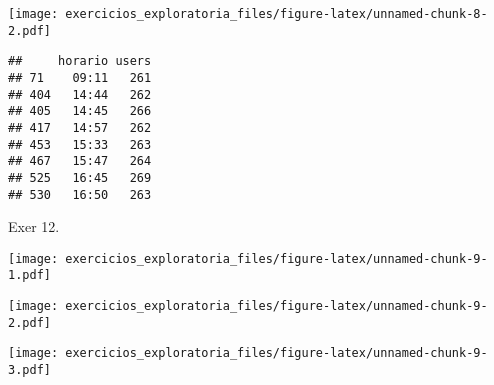 \documentclass[
]{article}
\newenvironment{Shaded}{\begin{snugshade}}{\end{snugshade}}
\newcommand{\AttributeTok}[1]{\textcolor[rgb]{0.13,0.29,0.53}{#1}}
\newcommand{\CommentTok}[1]{\textcolor[rgb]{0.56,0.35,0.01}{\textit{#1}}}
\newcommand{\DecValTok}[1]{\textcolor[rgb]{0.00,0.00,0.81}{#1}}
\newcommand{\FunctionTok}[1]{\textcolor[rgb]{0.13,0.29,0.53}{\textbf{#1}}}
\newcommand{\NormalTok}[1]{#1}
\newcommand{\OtherTok}[1]{\textcolor[rgb]{0.56,0.35,0.01}{#1}}
\newcommand{\SpecialCharTok}[1]{\textcolor[rgb]{0.81,0.36,0.00}{\textbf{#1}}}
\newcommand{\StringTok}[1]{\textcolor[rgb]{0.31,0.60,0.02}{#1}}
\begin{document}
\texttt{[image: exercicios\_exploratoria\_files/figure-latex/unnamed-chunk-8-2.pdf]}

\begin{Shaded}
\end{Shaded}

\begin{verbatim}
##     horario users
## 71    09:11   261
## 404   14:44   262
## 405   14:45   266
## 417   14:57   262
## 453   15:33   263
## 467   15:47   264
## 525   16:45   269
## 530   16:50   263
\end{verbatim}

\hfill\break
Exer 12.

\begin{Shaded}
\end{Shaded}

\texttt{[image: exercicios\_exploratoria\_files/figure-latex/unnamed-chunk-9-1.pdf]}

\begin{Shaded}
\end{Shaded}

\texttt{[image: exercicios\_exploratoria\_files/figure-latex/unnamed-chunk-9-2.pdf]}

\begin{Shaded}
\end{Shaded}

\texttt{[image: exercicios\_exploratoria\_files/figure-latex/unnamed-chunk-9-3.pdf]}
\end{document}
